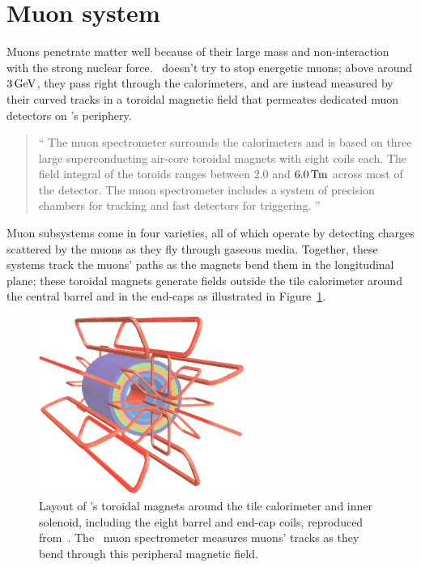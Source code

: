 \section{Muon system}
\label{sec:atlas_muon}
Muons penetrate matter well because of their large mass and non-interaction
with the strong nuclear force.
\atlas\ doesn't try to stop energetic muons;
above around $3\,\eV[G]$, they pass right through the calorimeters, and are
instead measured by their curved tracks in a toroidal magnetic field that
permeates dedicated muon detectors on \atlas's periphery.
\begin{quote}
``%
The muon spectrometer surrounds the calorimeters and is based on three large
superconducting air-core toroidal magnets with eight coils each.
The field integral of the toroids ranges between $2.0$ and
$6.0\,\mathrm{T\kern-0.15ex m}$ across most of the detector.
The muon spectrometer includes a system of precision chambers for tracking and
fast detectors for triggering.%
''~\cite{atlas2022searches}
\end{quote}
Muon subsystems come in four varieties, all of which operate by detecting
charges scattered by the muons as they fly through gaseous media.
Together, these systems track the muons' paths as the magnets bend them in the
longitudinal plane; these toroidal magnets generate fields outside the tile
calorimeter around the central barrel and in the end-caps as illustrated in
Figure~\ref{fig:atlas_magnets}.

\begin{figure}[tp]
\centering
\includegraphics[width=0.6\textwidth]{figures/atlas_magnets.pdf}
\caption[
Layout of \atlas's toroidal magnets around the tile calorimeter and inner
solenoid
]{%
Layout of \atlas's toroidal magnets around the tile calorimeter and inner
solenoid, including the eight barrel and end-cap coils,
reproduced from~\cite{atlas2008experiment}.
The \atlas\ muon spectrometer measures muons' tracks as they bend through
this peripheral magnetic field.
}
\label{fig:atlas_magnets}
\end{figure}

